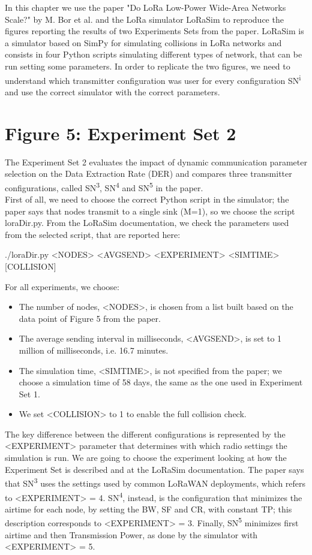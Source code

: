 In this chapter we use the paper "Do LoRa Low-Power Wide-Area Networks Scale?" by M. Bor et al. and the LoRa simulator LoRaSim to reproduce the figures reporting the results of two Experiments Sets from the paper. LoRaSim is a simulator based on SimPy for simulating collisions in LoRa networks and consists in four Python scripts simulating different types of network, that can be run setting some parameters. In order to replicate the two figures, we need to understand which transmitter configuration was user for every configuration SN\textsuperscript{i} and use the correct simulator with the correct parameters.

\section{Figure 5: Experiment Set 2}
The Experiment Set 2 evaluates the impact of dynamic communication parameter selection on the Data Extraction Rate (DER) and compares three transmitter configurations, called  SN\textsuperscript{3}, SN\textsuperscript{4} and SN\textsuperscript{5} in the paper.\\
First of all, we need to choose the correct Python script in the simulator; the paper says that nodes transmit to a single sink (M=1), so we choose the script loraDir.py. From the LoRaSim documentation, we check the parameters used from the selected script, that are reported here:
\begin{BreakableVerbatim}
./loraDir.py <NODES> <AVGSEND> <EXPERIMENT> <SIMTIME> [COLLISION]
\end{BreakableVerbatim}
For all experiments, we choose:
\begin{itemize}
\item The number of nodes, <NODES>, is chosen from a list built based on the data point of Figure 5 from the paper.
\item The average sending interval in milliseconds, <AVGSEND>, is set to 1 million of milliseconds, i.e. 16.7 minutes.
\item The simulation time, <SIMTIME>, is not specified from the paper; we choose a simulation time of 58 days, the same as the one used in Experiment Set 1.
\item We set <COLLISION> to 1 to enable the full collision check.
\end{itemize}
The key difference between the different configurations is represented by the <EXPERIMENT> parameter that determines with which radio settings the simulation is run. We are going to choose the experiment looking at how the Experiment Set is described and at the LoRaSim documentation. The paper says that SN\textsuperscript{3} uses the settings used by common LoRaWAN deployments, which refers to <EXPERIMENT> = 4. SN\textsuperscript{4}, instead, is the configuration that minimizes the airtime for each node, by setting the BW, SF and CR, with constant TP; this description corresponds to <EXPERIMENT> = 3. Finally, SN\textsuperscript{5} minimizes first airtime and then Transmission Power, as done by the simulator with <EXPERIMENT> = 5.

